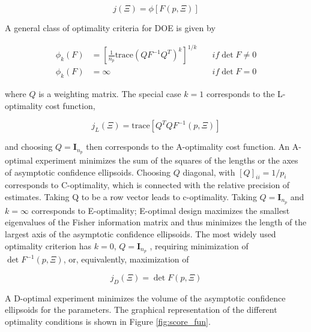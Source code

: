 \documentclass[]{scrartcl}
\begin{document}
\begin{equation}
	j(\Xi) = \phi\left[ F(p, \Xi) \right]
\end{equation}


A general class of optimality criteria for DOE is given by

\begin{align}
	\phi_k(F) &= \left[\frac{1}{n_p} \text{trace}\left( QF^{-1}Q^T \right)^k \right]^{1/k} \quad &if \det F \neq 0 \nonumber \\
	\phi_k(F) &= \infty \quad &if \det F = 0
\end{align}

where $Q$ is a weighting matrix. The special case $k = 1$ corresponds to the L-optimality cost function,

\begin{equation}
	j_L(\Xi) = \text{trace} \left[ Q^TQF^{-1}(p,\Xi) \right]
\end{equation}

and choosing $Q = \textbf{I}_{n_p}$ then corresponds to the A-optimality cost function. An A-optimal experiment minimizes the sum of the squares of the lengths or the axes of asymptotic confidence ellipsoids. Choosing $Q$ diagonal, with $[Q]_{ii} = 1/p_i$ corresponds to C-optimality, which is connected with the relative precision of estimates. Taking Q to be a row vector leads to c-optimality. Taking $Q = \textbf{I}_{n_p}$ and $k = \infty$ corresponds to E-optimality; E-optimal design maximizes the smallest eigenvalues of the Fisher information matrix and thus minimizes the length of the largest axis of the asymptotic confidence ellipsoids. The most widely used optimality criterion has $k = 0$, $Q = \textbf{I}_{n_p}$ , requiring minimization of $\det F^{-1}(p, \Xi)$, or, equivalently, maximization of

\begin{equation}
	j_D(\Xi) = \det F(p, \Xi)
\end{equation}

A D-optimal experiment minimizes the volume of the asymptotic confidence ellipsoids for the parameters. The graphical representation of the different optimality conditions is shown in Figure \ref{fig:score_fun}.
\end{document}
